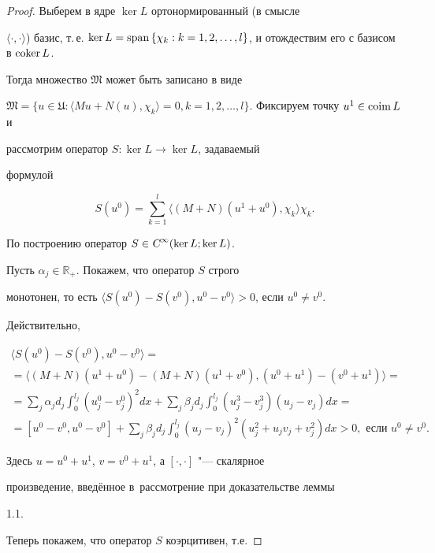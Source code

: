 \begin{proof}

Выберем в ядре $\ker L$ ортонормированный (в смысле

$\langle\cdot, \cdot\rangle$) базис, т.\,е. $\ker L={\rm span \, } \{\chi_k:

k=1, 2, \dots, l\}$, и отождествим его с базисом в ${\rm coker \, } L$.

Тогда множество $\mathfrak{M}$ может быть записано в виде

$\mathfrak{M}=\{u\in\mathfrak{U}:\langle Mu+N(u), \chi_k\rangle=0,

k=1, 2, \dots, l\}$. Фиксируем точку $u^1\in{\rm coim \, } L$ и

рассмотрим оператор $S:\ker L\rightarrow\ker L$, задаваемый

формулой

$$S(u^0)=\sum\limits_{k=1}^l\langle (M+N)(u^1+u^0), \chi_k\rangle\chi_k.$$

По построению оператор $S\in\textsl{C}^\infty(\ker L; \ker L)$.



Пусть $\alpha_j\in\mathbb{R}_+$. Покажем, что оператор $S$ строго

монотонен, то есть $\langle S(u^0)-S(v^0), u^0-v^0\rangle>0$, если $u^0\neq v^0$.

Действительно,

\begin{multline*}

 \langle S(u^0)-S(v^0), u^0-v^0\rangle= \\

=\langle(M+N)(u^1+u^0)-(M+N)(u^1+v^0), (u^0+u^1)-(v^0+u^1)\rangle=\\

=\sum\limits_j\alpha_jd_j\int_0^{l_j}(u_j^0-v_j^0)^2dx+\sum\limits_j\beta_jd_j\int_0^{l_j}(u_j^3-v_j^3)(u_j-v_j)dx=\\

=[u^0-v^0,u^0-v^0]+\sum\limits_j\beta_jd_j\int_0^{l_j}(u_j-v_j)^2(u_j^2+u_jv_j+v_j^2)dx>0, \text{ если } u^0\neq v^0.

\end{multline*}

Здесь $u=u^0+u^1$, $v=v^0+u^1$, а $[\cdot,\cdot]$ "--- скалярное

произведение, введённое в~рассмотрение при доказательстве леммы

1.1.



Теперь покажем, что оператор $S$ коэрцитивен, т.е.


\end{proof}
